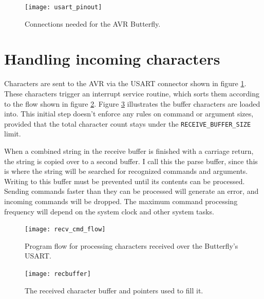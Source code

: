 \begin{figure}[ht]
    \begin{center}
        \texttt{[image: usart\_pinout]}
        \caption{Connections needed for the AVR Butterfly.\label{fig:connections}}
    \end{center}
\end{figure}

\clearpage
\section{Handling incoming characters}
Characters are sent to the AVR via the USART connector shown in figure \ref{fig:connections}.  These characters trigger an interrupt service routine, which sorts them according to the flow shown in figure \ref{fig:recflow}.  Figure \ref{fig:recbuffer} illustrates the buffer characters are loaded into.  This initial step doesn't enforce any rules on command or argument sizes, provided that the total character count stays under the \texttt{RECEIVE\_BUFFER\_SIZE} limit.

When a combined string in the receive buffer is finished with a carriage return, the string is copied over to a second buffer.  I call this the parse buffer, since this is where the string will be searched for recognized commands and arguments.  Writing to this buffer must be prevented until its contents can be processed.  Sending commands faster than they can be processed will generate an error, and incoming commands will be dropped.  The maximum command processing frequency will depend on the system clock and other system tasks.  

\begin{figure}[ht]
    \begin{center}
        \texttt{[image: recv\_cmd\_flow]}
        \caption{Program flow for processing characters received over the Butterfly's USART.\label{fig:recflow}}
    \end{center}
\end{figure}

\begin{figure}[ht]
    \begin{center}
        \texttt{[image: recbuffer]}
        \caption{The received character buffer and pointers used to fill it.\label{fig:recbuffer}}
    \end{center}
\end{figure}

